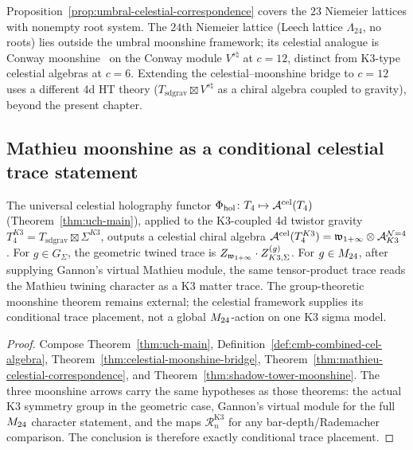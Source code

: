 \begin{remark}
\label{rem:cmb-umbral-reach}
Proposition~\ref{prop:umbral-celestial-correspondence} covers the $23$
Niemeier lattices with nonempty root system. The $24$th Niemeier
lattice (Leech lattice $\Lambda_{24}$, no roots) lies outside the
umbral moonshine framework; its celestial analogue is Conway
moonshine~\cite{DuncanMackOno} on the Conway module $V^{s\natural}$ at
$c = 12$, distinct from K3-type celestial algebras at $c = 6$.
Extending the celestial--moonshine bridge to $c = 12$ uses a
different 4d HT theory ($T_{\mathrm{sd grav}} \boxtimes V^{s\natural}$
as a chiral algebra coupled to gravity), beyond
the present chapter.
\end{remark}

\subsection{Mathieu moonshine as a conditional celestial trace statement}
\label{subsec:cmb-corollary}

\begin{corollary}
\label{cor:celestial-holography-recovers-moonshine}
The universal celestial holography functor
$\Phi_{\mathrm{hol}} \colon T_4 \mapsto \mathcal A^{\mathrm{cel}}(T_4)$
(Theorem~\ref{thm:uch-main}), applied to the K3-coupled 4d twistor
gravity $T_4^{K3} = T_{\mathrm{sd grav}} \boxtimes \Sigma^{K3}$,
outputs a celestial chiral algebra
$\mathcal A^{\mathrm{cel}}(T_4^{K3}) = \mathfrak w_{1+\infty} \otimes \mathcal A^{\mathcal{N}{=}4}_{K3}$.  For
$g \in G_\Sigma$, the geometric twined trace is
$Z_{\mathfrak w_{1+\infty}}\cdot Z_{K3,\Sigma}^{(g)}$.  For $g\in M_{24}$, after
supplying Gannon's virtual Mathieu module, the same tensor-product
trace reads the Mathieu twining character as a K3 matter trace.  The
group-theoretic moonshine theorem remains external; the celestial
framework supplies its conditional trace placement, not a global
\(M_{24}\)-action on one K3 sigma model.
\end{corollary}

\begin{proof}
Compose Theorem~\ref{thm:uch-main}, Definition~\ref{def:cmb-combined-cel-algebra},
Theorem~\ref{thm:celestial-moonshine-bridge},
Theorem~\ref{thm:mathieu-celestial-correspondence}, and
Theorem~\ref{thm:shadow-tower-moonshine}. The three moonshine arrows
carry the same hypotheses as those theorems: the actual K3 symmetry
group in the geometric case, Gannon's virtual module for the full
\(M_{24}\) character statement, and the maps
\(\mathcal R_n^{\mathrm{K3}}\) for any bar-depth/Rademacher comparison.
The conclusion is therefore exactly conditional trace placement.
\end{proof}


